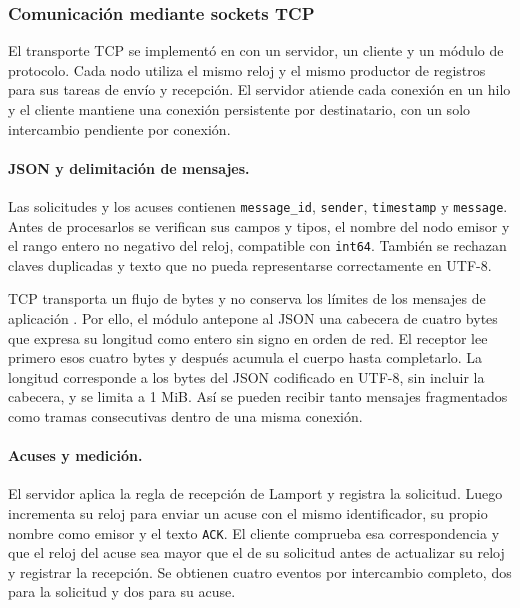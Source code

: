 \subsubsection{Comunicación mediante sockets TCP}

El transporte TCP se implementó en  con un servidor, un cliente
y un módulo de protocolo. Cada nodo utiliza el mismo reloj y el mismo productor
de registros para sus tareas de envío y recepción. El servidor atiende cada
conexión en un hilo y el cliente mantiene una conexión persistente por
destinatario, con un solo intercambio pendiente por conexión.

\paragraph{JSON y delimitación de mensajes.}
Las solicitudes y los acuses contienen \texttt{message\_id}, \texttt{sender},
\texttt{timestamp} y \texttt{message}. Antes de procesarlos se verifican sus
campos y tipos, el nombre del nodo emisor y el rango entero no negativo del
reloj, compatible con \texttt{int64}. También se rechazan claves duplicadas y
texto que no pueda representarse correctamente en UTF-8.

TCP transporta un flujo de bytes y no conserva los límites de los mensajes de
aplicación \cite[sección~3.7]{belinda_eddy2022_tcp}. Por ello, el módulo
 antepone al JSON una cabecera de cuatro bytes que
expresa su longitud como entero sin signo en orden de red. El receptor lee
primero esos cuatro bytes y después acumula el cuerpo hasta completarlo.
La longitud corresponde a los bytes del JSON codificado en UTF-8, sin incluir
la cabecera, y se limita a 1 MiB. Así se pueden recibir tanto mensajes
fragmentados como tramas consecutivas dentro de una misma conexión.

\paragraph{Acuses y medición.}
El servidor aplica la regla de recepción de Lamport y registra la solicitud.
Luego incrementa su reloj para enviar un acuse con el mismo identificador,
su propio nombre como emisor y el texto \texttt{ACK}. El cliente comprueba esa
correspondencia y que el reloj del acuse sea mayor que el de su solicitud antes
de actualizar su reloj y registrar la recepción. Se obtienen cuatro eventos
por intercambio completo, dos para la solicitud y dos para su acuse.


